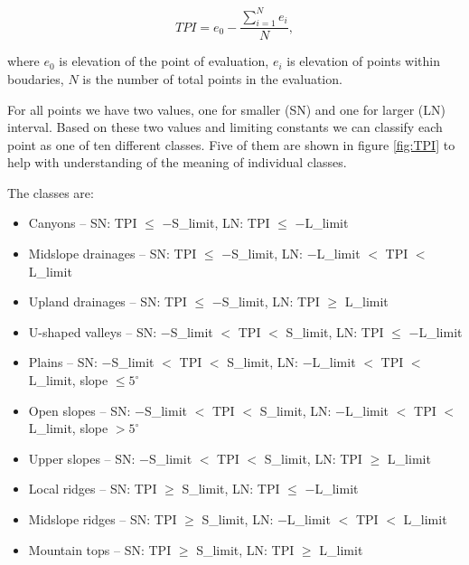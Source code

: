 \documentclass[oneside]{article}
\begin{document}
        \begin{equation}
            TPI=e_{0}-\frac{\sum_{i=1}^{N}e_{i}}{N},
            \label{egn:TPI}
        \end{equation}

        \noindent where $e_{0}$ is elevation of the point of evaluation, $e_{i}$ is elevation of points within boudaries, $N$ is the number of total points in the evaluation.

        For all points we have two values, one for smaller (SN) and one for larger (LN) interval. Based on these two values and limiting constants we can classify each point as one of ten different classes. Five of them are shown in figure \ref{fig:TPI} to help with understanding of the meaning of individual classes.

        \noindent The classes are:
        \begin{itemize}
            \item Canyons -- SN: TPI $\le$ $-$S\_limit, LN: TPI $\le$ $-$L\_limit
            \item Midslope drainages -- SN: TPI $\le$ $-$S\_limit, LN: $-$L\_limit $<$ TPI $<$ L\_limit
            \item Upland drainages -- SN: TPI $\le$ $-$S\_limit, LN: TPI $\ge$ L\_limit
            \item U-shaped valleys -- SN: $-$S\_limit $<$ TPI $<$ S\_limit, LN: TPI $\le$ $-$L\_limit
            \item Plains -- SN: $-$S\_limit $<$ TPI $<$ S\_limit, LN: $-$L\_limit $<$ TPI $<$ L\_limit, slope $\le5^{\circ}$
            \item Open slopes -- SN: $-$S\_limit $<$ TPI $<$ S\_limit, LN: $-$L\_limit $<$ TPI $<$ L\_limit, slope $>5^{\circ}$
            \item Upper slopes -- SN: $-$S\_limit $<$ TPI $<$ S\_limit, LN: TPI $\ge$ L\_limit
            \item Local ridges -- SN: TPI $\ge$ S\_limit, LN: TPI $\le$ $-$L\_limit
            \item Midslope ridges -- SN: TPI $\ge$ S\_limit, LN: $-$L\_limit $<$ TPI $<$ L\_limit
            \item Mountain tops -- SN: TPI $\ge$ S\_limit, LN: TPI $\ge$ L\_limit
        \end{itemize}
\end{document}
